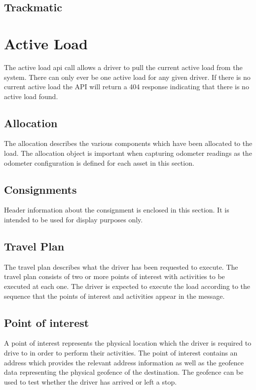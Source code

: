 \documentclass[letterpaper,10pt,english]{sphinxmanual}
\begin{document}
\subsection{Trackmatic}
\label{\detokenize{newAmend:trackmatic}}

\section{Active Load}
\label{\detokenize{loads/drivers/loads/active-load:active-load}}\label{\detokenize{loads/drivers/loads/active-load::doc}}
The active load api call allows a driver to pull the current active load from the system. There can only ever be one active load for any given driver. If there is no current active load the API will return a 404 response indicating that there is no active load found.


\subsection{Allocation}
\label{\detokenize{loads/drivers/loads/active-load:allocation}}
The allocation describes the various components which have been allocated to the load. The allocation object is important when capturing odometer readings as the odometer configuration is defined for each asset in this section.


\subsection{Consignments}
\label{\detokenize{loads/drivers/loads/active-load:consignments}}
Header information about the consignment is enclosed in this section. It is intended to be used for display purposes only.


\subsection{Travel Plan}
\label{\detokenize{loads/drivers/loads/active-load:travel-plan}}
The travel plan describes what the driver has been requested to execute. The travel plan consists of two or more points of interest with activities to be executed at each one. The driver is expected to execute the load according to the sequence that the points of interest and activities appear in the message.


\subsection{Point of interest}
\label{\detokenize{loads/drivers/loads/active-load:point-of-interest}}
A point of interest represents the physical location which the driver is required to drive to in order to perform their activities. The point of interest contains an address which provides the relevant address information as well as the geofence data representing the physical geofence of the destination. The geofence can be used to test whether the driver has arrived or left a stop.
\end{document}
